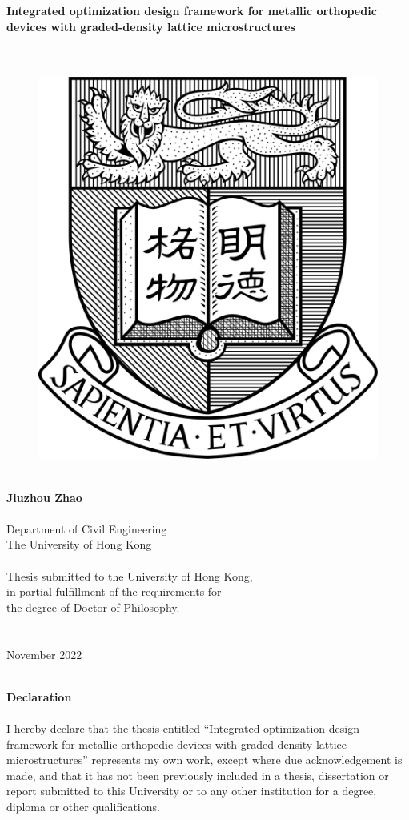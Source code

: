 \documentclass[12pt]{extbook}
\begin{document}
{\Large \bf Integrated optimization design framework for metallic orthopedic devices with graded-density lattice microstructures}\\
~\\
~\\
\begin{figure}[htbp]
\centering
\includegraphics[width=5 cm]{fig/logo}
\label{e_error}
\end{figure}
~\\
{\bf \large Jiuzhou Zhao}\\
~\\
Department of Civil Engineering\\
The University of Hong Kong\\
~\\
Thesis submitted to the University of Hong Kong,\\
in partial fulfillment of the requirements for\\
the degree of Doctor of Philosophy.\\
~\\
~\\
November 2022\\

\justifying

\newpage
\thispagestyle{empty}
~\\
\newpage
\thispagestyle{empty}
\centering
{\bf \large Declaration}\\
~\\
\justifying
I hereby declare that the thesis entitled ``Integrated optimization design framework for metallic orthopedic devices with graded-density lattice microstructures'' represents my own work, except where due acknowledgement is made, and that it has not been previously included in a thesis, dissertation or report submitted to this University or to any other institution for a degree, diploma or other qualifications.\\
\end{document}
